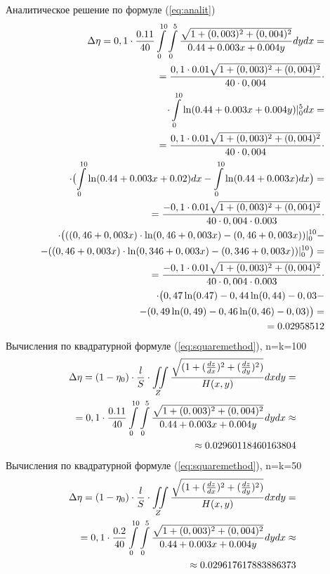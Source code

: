 \documentclass{article}
\begin{document}
Аналитическое решение по формуле (\ref{eq:analit})
\begin{align}\label{eq:analit1:max}
\Delta \eta = 0,1 \cdot \frac{0.11}{40} \int\limits_0^{10} \int\limits_0^5 \frac{\sqrt{1+(0,003)^2+(0,004)^2}}{0.44 + 0.003x + 0.004y} dy dx = \notag \\
= \frac{0,1 \cdot 0.01\sqrt{1+(0,003)^2+(0,004)^2}}{40 \cdot 0,004} \cdot \notag \\
\cdot \int\limits_0^{10} \ln(0.44 + 0.003x + 0.004y)|_0^5 dx = \notag \\
= \frac{0,1 \cdot 0.01\sqrt{1+(0,003)^2+(0,004)^2}}{40 \cdot 0,004} \cdot \notag \\
\cdot \bigl(\int\limits_0^{10} \ln(0.44 + 0.003x + 0.02)dx - \int\limits_0^{10} \ln(0.44 + 0.003x)dx \bigr) = \notag \\
= \frac{-0,1 \cdot 0.01\sqrt{1+(0,003)^2+(0,004)^2}}{40 \cdot 0,004 \cdot 0.003} \cdot \notag \\
\cdot \bigl(((0,46+0,003x) \cdot \ln(0,46+0,003x) - (0,46+0,003x))|_0^{10} - \notag \\
- ((0,46+0,003x) \cdot \ln(0,346+0,003x) - (0,346+0,003x))|_0^{10}\bigr) = \notag \\
= \frac{-0,1 \cdot 0.01\sqrt{1+(0,003)^2+(0,004)^2}}{40 \cdot 0,004 \cdot 0.003} \cdot \notag \\
\cdot \bigl(0,47 \ln(0.47)-0,44 \ln(0,44)-0,03- \notag \\
- (0,49 \ln(0,49)-0,46 \ln(0,46)-0,03)\bigr) = \notag \\
= 0.02958512
\end{align}
Вычисления по квадратурной формуле (\ref{eq:squaremethod}), n=k=100
\begin{align}\label{eq:sq1max10}
\Delta \eta = (1- \eta_0) \cdot \frac{l}{S} \cdot \iint\limits_Z \frac{\sqrt{(1+(\frac{dz}{dx})^2+ (\frac{dz}{dy})^2)}}{H(x,y)}dxdy = \notag \\
= 0,1 \cdot \frac{0.11}{40} \int\limits_0^{10} \int\limits_0^5 \frac{\sqrt{1+(0,003)^2+(0,004)^2}}{0.44 + 0.003x + 0.004y} dy dx \approx \notag \\
\approx 0.02960118460163804
\end{align}
Вычисления по квадратурной формуле (\ref{eq:squaremethod}), n=k=50
\begin{align}\label{eq:sq1max5}
\Delta \eta = (1- \eta_0) \cdot \frac{l}{S} \cdot \iint\limits_Z \frac{\sqrt{(1+(\frac{dz}{dx})^2+ (\frac{dz}{dy})^2)}}{H(x,y)}dxdy = \notag \\
= 0,1 \cdot \frac{0.2}{40} \int\limits_0^{10} \int\limits_0^5 \frac{\sqrt{1+(0,003)^2+(0,004)^2}}{0.44 + 0.003x + 0.004y} dy dx \approx \notag \\ 
\approx 0.029617617883886373
\end{align}
\end{document}
